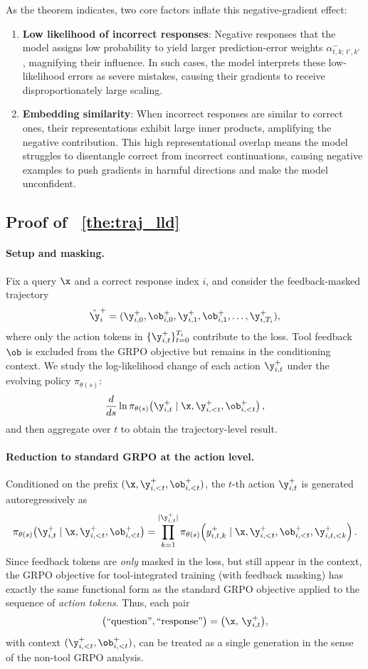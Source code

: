 As the theorem indicates, two core factors inflate this negative-gradient effect:
\begin{enumerate}
 \item \textbf{Low likelihood of incorrect responses}: Negative responses that the model assigns low probability to yield larger prediction-error weights $\alpha^-_{t,k;\,t',k'}$ , magnifying their influence. In such cases, the model interprets these low-likelihood errors as severe mistakes, causing their gradients to receive disproportionately large scaling.
    \item \textbf{Embedding similarity}: When incorrect responses are similar to correct ones,
    their representations exhibit large inner products, amplifying the negative
    contribution. This high representational overlap means the model struggles to disentangle correct from incorrect continuations, causing negative examples to push gradients in harmful directions and make the model unconfident.
\end{enumerate}


\subsection{Proof of ~\cref{the:traj_lld}}
\paragraph{Setup and masking.}
Fix a query $\x$ and a correct response index $i$, and consider the feedback-masked trajectory
\[
\hat{\y}^+_i = (\y^+_{i,0}, \ob^+_{i,0}, \y^+_{i,1}, \ob^+_{i,1}, \ldots, \y^+_{i,T_i}),
\]
where only the action tokens in $\{\y^+_{i,t}\}_{t=0}^{T_i}$ contribute to the loss.
Tool feedback $\ob$ is excluded from the GRPO objective but remains in the conditioning context.
We study the log-likelihood change of each action $\y^+_{i,t}$ under the evolving policy $\pi_{\theta(s)}$:
\[
\frac{d}{ds}\ln \pi_{\theta(s)}\!\left(\y^+_{i,t} \mid \x, \y^+_{i,<t}, \ob^+_{i,<t}\right),
\]
and then aggregate over $t$ to obtain the trajectory-level result.

\paragraph{Reduction to standard GRPO at the action level.}
Conditioned on the prefix $(\x,\y^+_{i,<t},\ob^+_{i,<t})$, the $t$-th action $\y^+_{i,t}$ is generated
autoregressively as
\[
\pi_{\theta(s)}\!\left(\y^+_{i,t} \mid \x, \y^+_{i,<t}, \ob^+_{i,<t}\right)
=
\prod_{k=1}^{|\y^+_{i,t}|}
\pi_{\theta(s)}\!\left(y^+_{i,t,k} \mid \x, \y^+_{i,<t}, \ob^+_{i,<t}, \y^+_{i,t,<k}\right).
\]
Since feedback tokens are \emph{only} masked in the loss, but still appear in the context, the GRPO
objective for tool-integrated training (with feedback masking) has exactly the same functional form
as the standard GRPO objective applied to the sequence of \emph{action tokens}.
Thus, each pair
\[
\bigl(\text{``question''}, \text{``response''}\bigr)
=
\bigl(\x,\,\y^+_{i,t}\bigr),
\]
with context $(\y^+_{i,<t},\ob^+_{i,<t})$, can be treated as a single generation in the sense of the
non-tool GRPO analysis.

